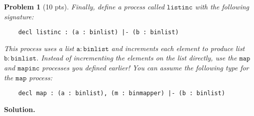 \documentclass{article}
\newcommand{\mt}[1]{\mathtt{#1}}
\newtheorem{problem}{Problem}
\newenvironment{solution}{\textbf{Solution.}}{}
\begin{document}
\begin{problem}[10 pts]
  Finally, define a process called $\mt{listinc}$ with the following signature:
  \begin{lstlisting}
    decl listinc : (a : binlist) |- (b : binlist)
  \end{lstlisting}
  This process uses a list $\mt{a : binlist}$ and increments each element to produce list $\mt{b : binlist}$.
  Instead of incrementing the elements on the list directly, use the $\mt{map}$ and $\mt{mapinc}$ processes 
  you defined earlier! You can assume the following type for the $\mt{map}$ process:
  \begin{lstlisting}
    decl map : (a : binlist), (m : binmapper) |- (b : binlist)
  \end{lstlisting}
\end{problem}

\begin{solution}
  
\end{solution}
\end{document}
